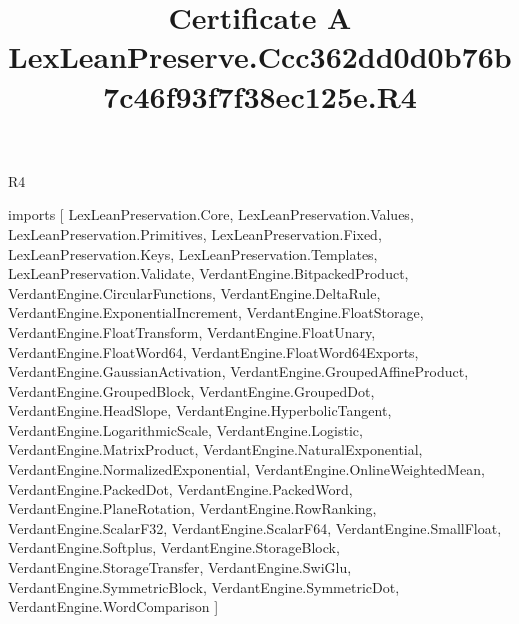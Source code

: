\begin{lexlean}{R4}
\title{Certificate A LexLeanPreserve.Ccc362dd0d0b76b7c46f93f7f38ec125e.R4}
\begin{coremodule}
imports [
  LexLeanPreservation.Core,
  LexLeanPreservation.Values,
  LexLeanPreservation.Primitives,
  LexLeanPreservation.Fixed,
  LexLeanPreservation.Keys,
  LexLeanPreservation.Templates,
  LexLeanPreservation.Validate,
  VerdantEngine.BitpackedProduct,
  VerdantEngine.CircularFunctions,
  VerdantEngine.DeltaRule,
  VerdantEngine.ExponentialIncrement,
  VerdantEngine.FloatStorage,
  VerdantEngine.FloatTransform,
  VerdantEngine.FloatUnary,
  VerdantEngine.FloatWord64,
  VerdantEngine.FloatWord64Exports,
  VerdantEngine.GaussianActivation,
  VerdantEngine.GroupedAffineProduct,
  VerdantEngine.GroupedBlock,
  VerdantEngine.GroupedDot,
  VerdantEngine.HeadSlope,
  VerdantEngine.HyperbolicTangent,
  VerdantEngine.LogarithmicScale,
  VerdantEngine.Logistic,
  VerdantEngine.MatrixProduct,
  VerdantEngine.NaturalExponential,
  VerdantEngine.NormalizedExponential,
  VerdantEngine.OnlineWeightedMean,
  VerdantEngine.PackedDot,
  VerdantEngine.PackedWord,
  VerdantEngine.PlaneRotation,
  VerdantEngine.RowRanking,
  VerdantEngine.ScalarF32,
  VerdantEngine.ScalarF64,
  VerdantEngine.SmallFloat,
  VerdantEngine.Softplus,
  VerdantEngine.StorageBlock,
  VerdantEngine.StorageTransfer,
  VerdantEngine.SwiGlu,
  VerdantEngine.SymmetricBlock,
  VerdantEngine.SymmetricDot,
  VerdantEngine.WordComparison
]


\end{coremodule}
\end{lexlean}
